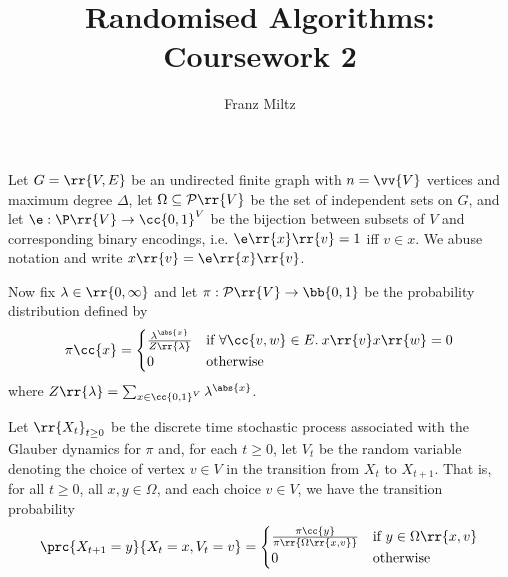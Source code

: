 \documentclass{article}
\title{Randomised Algorithms: Coursework 2}
\author{Franz Miltz}
\begin{document}
\maketitle

Let $G=\rr{V,E}$ be an undirected finite graph with $n=\vv{V}$ vertices and maximum degree $\Delta$, let $\Omega\subseteq\mathcal P\rr{V}$
be the set of independent sets on $G$, and let $\e:\P\rr{V}\to \cc{0,1}^V$ be the bijection
between subsets of $V$ and corresponding binary encodings, i.e. $\e\rr{x}\rr{v}=1$ iff $v\in x$.
We abuse notation and write $x\rr{v}=\e\rr{x}\rr{v}$.

Now fix $\lambda\in\rr{0,\infty}$ and let $\pi:\mathcal P\rr{V}\to\bb{0,1}$ be the probability distribution defined by
\begin{align*}
  \pi\cc{x}=
  \begin{cases}
    \frac{\lambda^{\abs{x}}}{Z\rr{\lambda}} &\text{if }\forall \cc{v,w}\in E.\:x\rr{v}x\rr{w}=0 \\
    0 &\text{otherwise}
  \end{cases}
\end{align*}
where $Z\rr{\lambda}=\sum_{x\in\cc{0,1}^V} \lambda^{\abs{x}}$.

Let $\rr{X_t}_{t\geq 0}$ be the discrete time stochastic process associated with the Glauber dynamics
for $\pi$ and, for each $t\geq 0$, let $V_t$ be the random variable denoting the choice of
vertex $v\in V$ in the transition from $X_t$ to $X_{t+1}$. That is, for all $t\geq 0$, all $x,y\in\Omega$,
and each choice $v\in V$, we have the transition probability
\begin{align*}
  \prc{X_{t+1}=y}{X_t=x, V_t=v} =
  \begin{cases}
    \frac{\pi\cc{y}}{\pi\rr{\Omega\rr{x,v}}} &\text{if }y\in\Omega\rr{x,v} \\
    0 &\text{otherwise}
  \end{cases}
\end{align*}
\end{document}
